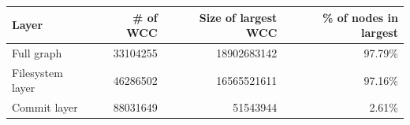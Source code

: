 \documentclass[aspectratio=169,xcolor=table]{beamer}
\begin{document}
\begin{frame}
        \begin{center}
            \begin{tabular}[t]{l r r r}
                \textbf{Layer} & \textbf{\# of WCC}
                               & \textbf{Size of largest WCC}
                               & \textbf{\% of nodes in largest}
                               \\
                               \hline
                Full graph       & \num{33104255}  & \num{18902683142} & 97.79\% \\
                Filesystem layer & \num{46286502}  & \num{16565521611} & 97.16\% \\
                Commit layer     & \num{88031649}  & \num{51543944}    & 2.61\% \\
            \end{tabular}
        \end{center}
    \end{frame}
\end{document}
